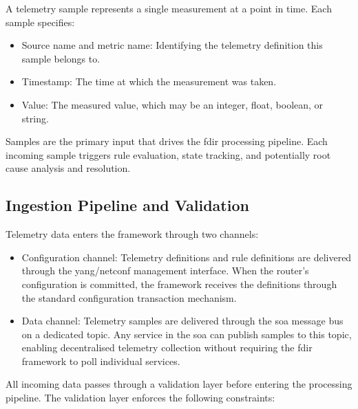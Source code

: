 A telemetry sample represents a single measurement at a point in time. Each sample specifies:

\begin{itemize}
\item Source name and metric name: Identifying the telemetry definition this sample belongs to.
\item Timestamp: The time at which the measurement was taken.
\item Value: The measured value, which may be an integer, float, boolean, or string.
\end{itemize}

Samples are the primary input that drives the \gls{fdir} processing pipeline. Each incoming sample triggers rule evaluation, state tracking, and potentially root cause analysis and resolution.

\subsection{Ingestion Pipeline and Validation}\label{sec:ingestion-validation}

Telemetry data enters the framework through two channels:

\begin{itemize}
\item Configuration channel: Telemetry definitions and rule definitions are delivered through the \gls{yang}/\gls{netconf} management interface. When the router's configuration is committed, the framework receives the definitions through the standard configuration transaction mechanism.
\item Data channel: Telemetry samples are delivered through the \gls{soa} message bus on a dedicated topic. Any service in the \gls{soa} can publish samples to this topic, enabling decentralised telemetry collection without requiring the \gls{fdir} framework to poll individual services.
\end{itemize}

All incoming data passes through a validation layer before entering the processing pipeline. The validation layer enforces the following constraints:

